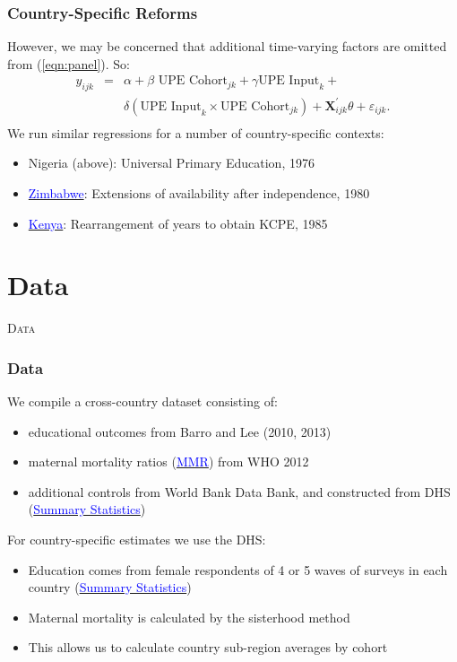 \documentclass[10pt,letterpaper,subeqn, xcolor=table]{beamer}
\begin{document}
\begin{frame}[label=ID]
\frametitle{Country-Specific Reforms}
However, we may be concerned that additional time-varying factors are omitted from (\ref{eqn:panel}). So:
\begin{eqnarray}
 \label{eqn:Nigeria}
 y_{ijk}&=&\alpha + \beta \text{ UPE Cohort}_{jk}+\gamma \text{UPE Input}_k+ \\ \nonumber
& & \delta(\text{UPE Input}_k\times\text{UPE Cohort}_{jk})+\textbf{X}^\prime_{ijk}\theta+\varepsilon_{ijk}. \\
\nonumber
\end{eqnarray}
\vspace{5mm}
We run similar regressions for a number of country-specific contexts:
\begin{itemize}
\item Nigeria (above): Universal Primary Education, 1976
\item \hyperlink{ZIMBABWE}{\textcolor{blue}{Zimbabwe}}: Extensions of availability after independence, 1980
\item \hyperlink{KENYA}{\textcolor{blue}{Kenya}}: Rearrangement of years to obtain KCPE, 1985
\end{itemize}
\end{frame}


\section{Data}
\begin{frame}
\begin{center}
\Large	
\textsc{\textcolor{dblue}{Data}}
\end{center}
\end{frame}

\begin{frame}[label=DATA]
\frametitle{Data}
We compile a cross-country dataset consisting of:
\begin{itemize}
\item educational outcomes from Barro and Lee (2010, 2013)
\item maternal mortality ratios (\hyperlink{MMRnote}{\textcolor{blue}{MMR}}) from WHO 2012
\item additional controls from World Bank Data Bank, and constructed from DHS (\hyperlink{SumStats}{\textcolor{blue}{Summary Statistics}})
\end{itemize}
\vspace{5mm}
For country-specific estimates we use the DHS:
\begin{itemize}
\item Education comes from female respondents of 4 or 5 waves of surveys in each country (\hyperlink{SumStatsCountry}{\textcolor{blue}{Summary Statistics}})
\item Maternal mortality is calculated by the sisterhood method
\item This allows us to calculate country sub-region averages by cohort
\end{itemize}
\end{frame}
\end{document}
